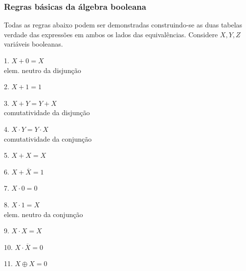 \documentclass{beamer}
\begin{document}
\begin{frame}
 \frametitle{Regras básicas da álgebra booleana}

Todas as regras abaixo podem ser demonstradas construindo-se as duas tabelas verdade das expressões em ambos os lados das equivalências. Considere $X, Y, Z$ variáveis booleanas.

\vspace{6pt}

\begin{minipage}[t]{0.34\textwidth}
 1. $X + 0 = X$ \\
\footnotesize{elem. neutro da disjunção}
\end{minipage}
%
\pause%
%
\begin{minipage}[t]{0.31\textwidth}
 2. $X+1 = 1$
\end{minipage}
%
\pause%
%
\begin{minipage}[t]{0.32\textwidth}
 3. $X + Y = Y + X$ \\
 \footnotesize{comutatividade da disjunção}
\end{minipage}

\vspace{12pt}

\pause

\begin{minipage}[t]{0.34\textwidth}
 4. $X \cdot Y = Y \cdot X$\\
 \footnotesize{comutatividade da conjunção}
\end{minipage}
%
\pause%
%
\begin{minipage}[t]{0.31\textwidth}
 5. $X + X = X$
\end{minipage}
%
\pause%
%
\begin{minipage}[t]{0.32\textwidth}
 6. $X + \overline{X} = 1$
\end{minipage}

\vspace{12pt}

\pause

\begin{minipage}[t]{0.34\textwidth}
 7. $X \cdot 0 = 0$
\end{minipage}
%
\pause%
%
\begin{minipage}[t]{0.31\textwidth}
 8. $X \cdot 1 = X$ \\
 \footnotesize{elem. neutro da conjunção}
\end{minipage}
%
\pause%
%
\begin{minipage}[t]{0.32\textwidth}
 9. $X \cdot X = X$
\end{minipage}

\vspace{12pt}

\pause

\begin{minipage}[t]{0.34\textwidth}
 10. $X \cdot \overline{X} = 0$
\end{minipage}
%
\pause%
%
\begin{minipage}[t]{0.31\textwidth}
 11. $X \oplus X = 0$ 
\end{minipage}

\end{frame}
\end{document}
